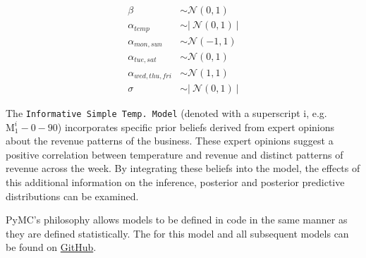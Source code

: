 \begin{equation}
  \label{eq:simple_tempv2_priors}
  \begin{split}
    \beta & \sim \mathcal{N}(0, 1) \\
    \alpha_{temp} & \sim \left| \ \mathcal{N}(0,1) \ \right| \\
    \alpha_{mon,sun} & \sim \mathcal{N}(-1, 1) \\
    \alpha_{tue,sat} & \sim \mathcal{N}(0, 1) \\
    \alpha_{wed,thu,fri} & \sim \mathcal{N}(1, 1) \\
    \sigma & \sim \left| \ \mathcal{N}(0,1) \ \right|
  \end{split}
\end{equation}

The \texttt{Informative Simple Temp.\ Model} (denoted with a superscript i,
e.g. $\text{M}_1^i-0-90$) incorporates specific prior beliefs derived from
expert opinions about the revenue patterns of the business. These expert
opinions suggest a positive correlation between temperature and revenue and
distinct patterns of revenue across the week. By integrating these
beliefs into the model, the effects of this additional information on the
inference, posterior and posterior predictive distributions can be examined.

PyMC's philosophy allows models to be defined in code in the same manner as
they are defined statistically. The for this model and all subsequent models
can be found on
\href{https://github.com/louisbrandt/bayesian-data-analysis}{GitHub}. 
